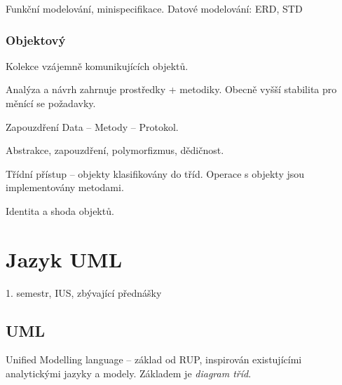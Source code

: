 \documentclass[a4paper, 11pt]{report}
\begin{document}
Funkční modelování, minispecifikace. Datové modelování: ERD, STD

\subsection{Objektový}
Kolekce vzájemně komunikujících objektů.

Analýza a návrh zahrnuje prostředky + metodiky. Obecně vyšší stabilita pro měnící se požadavky.

Zapouzdření Data -- Metody -- Protokol.

Abstrakce, zapouzdření, polymorfizmus, dědičnost.

Třídní přístup -- objekty klasifikovány do tříd. Operace s objekty jsou implementovány metodami.

Identita a shoda objektů.



































\chapter{Jazyk UML} \label{cha:31}

1. semestr, IUS, zbývající přednášky

\section{UML}
Unified Modelling language -- základ od RUP, inspirován existujícími analytickými jazyky a modely. Základem je \emph{diagram tříd}.
\end{document}
